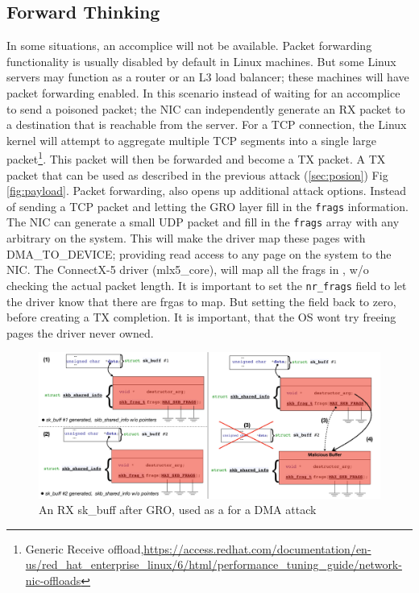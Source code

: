 \subsection{Forward Thinking}
In some situations, an accomplice will not be available. Packet forwarding functionality is usually disabled by default in Linux machines. But some Linux servers may function as a router or an L3 load balancer; these machines will have packet forwarding enabled. In this scenario instead of waiting for an accomplice to send a poisoned packet; the NIC can independently generate an RX packet to a destination that is reachable from the server. For a TCP connection, the Linux kernel will attempt to aggregate multiple TCP segments into a single large packet\footnote{Generic Receive offload,\url{https://access.redhat.com/documentation/en-us/red_hat_enterprise_linux/6/html/performance_tuning_guide/network-nic-offloads}}. This packet will then be forwarded and become a TX packet. A TX packet that can be used as described in the previous attack (\ref{sec:posion}) Fig \ref{fig:payload}. \newline
Packet forwarding, also opens up additional attack options. Instead of sending a TCP packet and letting the GRO layer fill in the \texttt{frags} information. The NIC can generate a small UDP packet and fill in the \texttt{frags} array with any arbitrary \page on the system. This will make the driver map these pages with DMA\_TO\_DEVICE; providing read access to any page on the system to the NIC. The ConnectX-5 driver (mlx5\_core), will map all the frags in \shinfo, w/o checking the actual packet length. It is important to set the \texttt{nr\_frags} field to let the driver know that there are frgas to map. But setting the field back to zero, before creating a TX completion. It is important, that the OS wont try freeing pages the driver never owned.

\begin{figure}[t]
    \centering
    \includegraphics[width=\linewidth]{figs/gro.pdf}
    \caption{An RX sk\_buff after GRO, used as a \means for a DMA attack}
    \label{fig:gro}
\end{figure}

